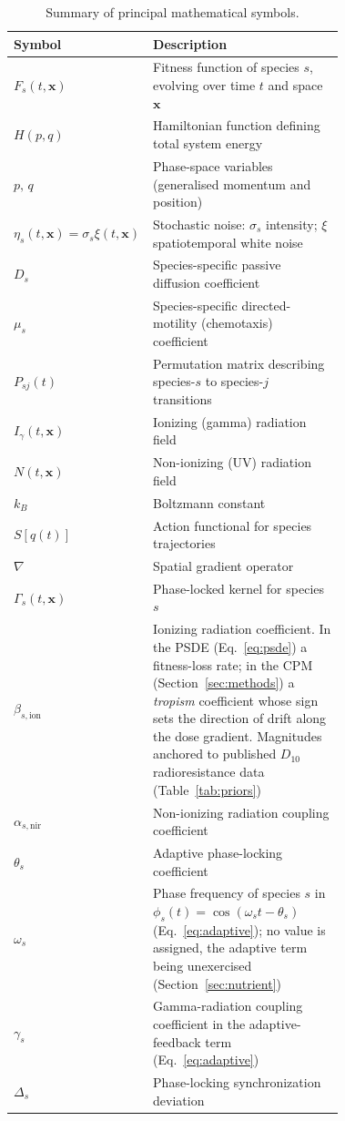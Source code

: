 \documentclass[11pt]{article}
\begin{document}
\begin{table}[h!]
\centering
\small
\caption{Summary of principal mathematical symbols.}
\label{tab:notation}
\begin{tabular}{@{}lp{0.72\linewidth}@{}}
\toprule
\textbf{Symbol} & \textbf{Description} \\
\midrule
$F_s(t,\mathbf{x})$ & Fitness function of species $s$, evolving over time $t$ and space $\mathbf{x}$ \\
$H(p,q)$            & Hamiltonian function defining total system energy \\
$p,\,q$             & Phase-space variables (generalised momentum and position) \\
$\eta_s(t,\mathbf{x}) = \sigma_s\xi(t,\mathbf{x})$ & Stochastic noise: $\sigma_s$ intensity; $\xi$ spatiotemporal white noise \\
$D_s$               & Species-specific passive diffusion coefficient \\
$\mu_s$             & Species-specific directed-motility (chemotaxis) coefficient \\
$P_{sj}(t)$         & Permutation matrix describing species-$s$ to species-$j$ transitions \\
$I_\gamma(t,\mathbf{x})$ & Ionizing (gamma) radiation field \\
$N(t,\mathbf{x})$   & Non-ionizing (UV) radiation field \\
$k_B$               & Boltzmann constant \\
$S[q(t)]$           & Action functional for species trajectories \\
$\nabla$            & Spatial gradient operator \\
$\Gamma_s(t,\mathbf{x})$ & Phase-locked kernel for species $s$ \\
$\beta_{s,\mathrm{ion}}$ & Ionizing radiation coefficient. In the PSDE (Eq.~\ref{eq:psde}) a fitness-loss rate; in the CPM (Section~\ref{sec:methods}) a \emph{tropism} coefficient whose sign sets the direction of drift along the dose gradient. Magnitudes anchored to published $D_{10}$ radioresistance data (Table~\ref{tab:priors}) \\
$\alpha_{s,\mathrm{nir}}$ & Non-ionizing radiation coupling coefficient \\
$\theta_s$          & Adaptive phase-locking coefficient \\
$\omega_s$          & Phase frequency of species $s$ in $\phi_s(t)=\cos(\omega_s t-\theta_s)$ (Eq.~\ref{eq:adaptive}); no value is assigned, the adaptive term being unexercised (Section~\ref{sec:nutrient}) \\
$\gamma_s$          & Gamma-radiation coupling coefficient in the adaptive-feedback term (Eq.~\ref{eq:adaptive}) \\
$\Delta_s$          & Phase-locking synchronization deviation \\
\bottomrule
\end{tabular}
\end{table}
\end{document}
